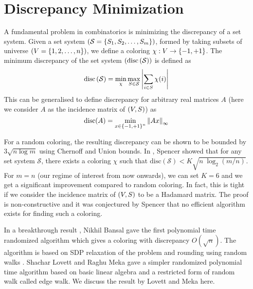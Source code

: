 \section{Discrepancy Minimization}

A fundamental problem in combinatorics is minimizing the discrepancy of a set system.
Given a set system $\left(\mathcal{S} = \left\{S_1,S_2,\hdots,S_m\right\} \right )$, formed by taking subsets of universe $\left(V = \left\{1,2,\hdots,n\right\} \right )$, we define a coloring $\chi: V \to \left\{-1,+1\right\}$.
The minimum discrepancy of the set system $\left(\text{disc}\left(\mathcal{S} \right ) \right )$ is defined as
\[ \text{disc}\left(\mathcal{S} \right ) = \min_{\chi}\max_{S \in \mathcal{S}}{\left\lvert \sum_{i \in S}{\chi(i)} \right\rvert} \]
This can be generalised to define discrepancy for arbitrary real matrices $A$ (here we consider $A$ as the incidence matrix of $\left(V,S \right )$) as
\[ \text{disc}(A) = \min_{x \in \left\{-1,+1\right\}^n} \left\lVert Ax \right\rVert_{\infty}\]

For a random coloring, the resulting discrepancy can be shown to be bounded by $3\sqrt{n\log m}$ using Chernoff and Union bounds.
In \cite{Spencer1985}, Spencer showed that for any set system $\mathcal{S}$, there exists a coloring $\chi$ such that $\text{disc}(\mathcal{S}) < K\sqrt{n\;\log_2{(m/n)}}$.
For $m=n$ (our regime of interest from now onwards), we can set $K=6$ and we get a significant improvement compared to random coloring.
In fact, this is tight if we consider the incidence matrix of $\left(V,S \right )$ to be a Hadamard matrix. The proof is non-constructive and it was conjectured by Spencer that no efficient algorithm exists for finding such a coloring.

In a breakthrough result \cite{bansal10cadm}, Nikhil Bansal gave the first polynomial time randomized algorithm which gives a coloring with discrepancy $O(\sqrt{n})$.
The algorithm is based on SDP relaxation of the problem and rounding using random walks .
Shachar Lovett and Raghu Meka \cite{12lovettmeka} gave a simpler randomized polynomial time algorithm based on basic linear algebra and a restricted form of random walk called edge walk.
We discuss the result by Lovett and Meka here.

